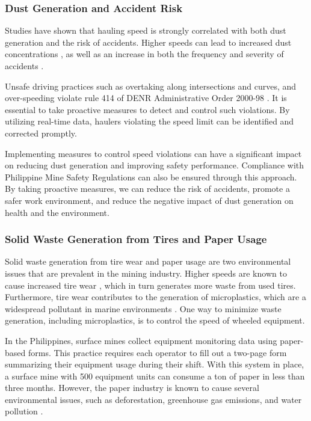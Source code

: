 \documentclass[12pt]{report}
\begin{document}
\subsubsection{Dust Generation and Accident Risk}

Studies have shown that hauling speed is strongly correlated with both dust generation and the risk of accidents.
Higher speeds can lead to increased dust concentrations \cite{SpeedDust}, as well as an increase in both the frequency and severity of accidents \cite{SpeedAccident}.

Unsafe driving practices such as overtaking along intersections and curves, and over-speeding violate rule 414 of DENR Administrative Order 2000-98 \cite{DAO2000-98}.
It is essential to take proactive measures to detect and control such violations.
By utilizing real-time data, haulers violating the speed limit can be identified and corrected promptly.

Implementing measures to control speed violations can have a significant impact on reducing dust generation and improving safety performance.
Compliance with Philippine Mine Safety Regulations can also be ensured through this approach.
By taking proactive measures, we can reduce the risk of accidents, promote a safer work environment, and reduce the negative impact of dust generation on health and the environment.

\subsubsection{Solid Waste Generation from Tires and Paper Usage}

Solid waste generation from tire wear and paper usage are two environmental issues that are prevalent in the mining industry.
Higher speeds are known to cause increased tire wear \cite{TyreWear}, which in turn generates more waste from used tires.
Furthermore, tire wear contributes to the generation of \gls{microplastics}, which are a widespread pollutant in marine environments \cite{TireMicroplastic}.
One way to minimize waste generation, including microplastics, is to control the speed of wheeled equipment.

In the Philippines, surface mines collect equipment monitoring data using paper-based forms.
This practice requires each operator to fill out a two-page form summarizing their equipment usage during their shift. 
With this system in place, a surface mine with 500 equipment units can consume a ton of paper in less than three months. 
However, the paper industry is known to cause several environmental issues, such as deforestation, greenhouse gas emissions, and water pollution \cite{PaperIndustry}.
\end{document}
